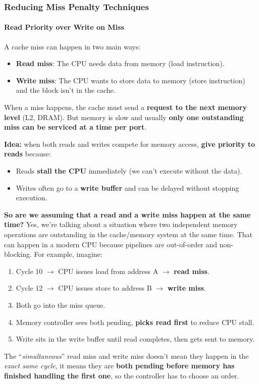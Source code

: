 \subsubsection{Reducing Miss Penalty Techniques}

\paragraph{Read Priority over Write on Miss}\label{paragraph: Read Priority over Write on Miss}

A cache miss can happen in two main ways:
\begin{itemize}
    \item \textbf{Read miss}: The CPU needs data from memory (load instruction).
    \item \textbf{Write miss}: The CPU wants to store data to memory (store instruction) and the block isn't in the cache.
\end{itemize}
When a miss happens, the cache must send a \textbf{request to the next memory level} (L2, DRAM). But memory is slow and usually \textbf{only one outstanding miss can be serviced at a time per port}.

\highspace
\textbf{Idea:} when both reads and writes compete for memory access, \textbf{give priority to reads} because:
\begin{itemize}
    \item Reads \textbf{stall the CPU} immediately (we can't execute without the data).
    \item Writes often go to a \textbf{write buffer} and can be delayed without stopping execution.
\end{itemize}
\textcolor{Green3}{ \textbf{So are we assuming that a read and a write miss happen at the same time?}} Yes, we're talking about a situation where two independent memory operations are outstanding in the cache/memory system at the same time. That can happen in a modern CPU because pipelines are out-of-order and non-blocking. For example, imagine:
\begin{enumerate}
    \item Cycle 10 $\rightarrow$ CPU issues load from address A $\rightarrow$ \textbf{read miss}.
    \item Cycle 12 $\rightarrow$ CPU issues store to address B $\rightarrow$ \textbf{write miss}.
    \item Both go into the miss queue.
    \item Memory controller sees both pending, \textbf{picks read first} to reduce CPU stall.
    \item Write sits in the write buffer until read completes, then gets sent to memory.
\end{enumerate}
The ``\emph{simultaneous}'' read miss and write miss doesn't mean they happen in the \emph{exact same cycle}, it means they are \textbf{both pending before memory has finished handling the first one}, so the controller has to choose an order.

